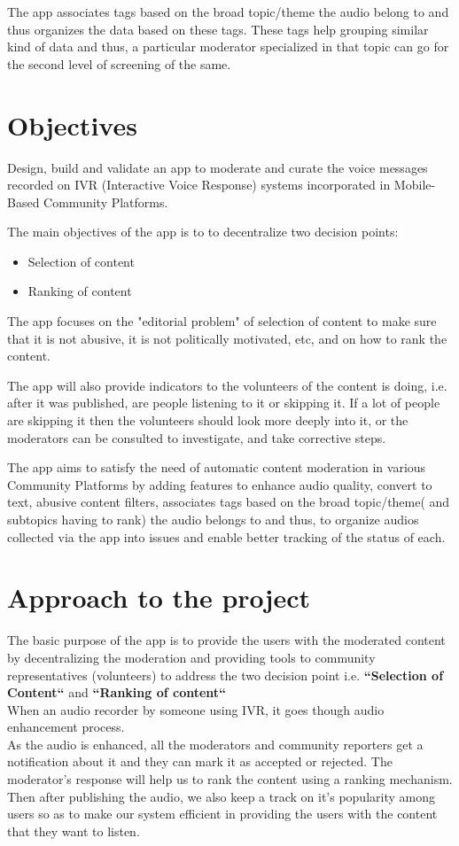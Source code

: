 \documentclass[11pt]{article}
\begin{document}
    
    The app associates tags based on the broad topic/theme the audio belong to and thus organizes the data based on these tags. These tags help grouping similar kind of data and thus, a particular moderator specialized in that topic can go for the second level of screening of the same.
    

	\section{Objectives}
	Design, build and validate an app to moderate and curate the voice messages recorded on IVR (Interactive Voice Response) systems incorporated in Mobile-Based Community Platforms.

    The main objectives of the app is to to decentralize two decision points:
     \begin{itemize}
				\item
				        Selection of content
				\item
				        Ranking of content
			\end{itemize}
The app focuses on the "editorial problem" of selection of content to make sure that it is not abusive, it is not politically motivated, etc, and on how to rank the content.
\bigskip

The app will also provide indicators to the volunteers of the content is doing, i.e. after it was published, are people listening to it or skipping it. If a lot of people are skipping it then the volunteers should look more deeply into it, or the moderators can be consulted to investigate, and take corrective steps.

\bigskip

The app aims to satisfy the need of automatic content moderation in various Community Platforms by adding features to enhance audio quality, convert to text, abusive content filters, associates tags based on the broad topic/theme( and subtopics having to rank) the audio belongs to and thus, to organize audios collected via the app into issues and enable better tracking of the status of each.

\pagebreak
\section{Approach to the project}
    The basic purpose of the app is to provide the users with the moderated content by decentralizing the moderation and providing tools to community representatives (volunteers) to address the two decision point i.e. \textbf{``Selection of Content``} and \textbf{``Ranking of content``}\\
    \bigskip
    When an audio recorder by someone using IVR, it goes though audio enhancement process.\\
    As the audio is enhanced, all the moderators and community reporters get a notification about it and they can mark it as accepted or rejected. The moderator's response will help us to rank the content using a ranking mechanism. Then after publishing the audio, we also keep a track on it's popularity among users so as to make our system efficient in providing the users with the content that they want to listen.
\end{document}
